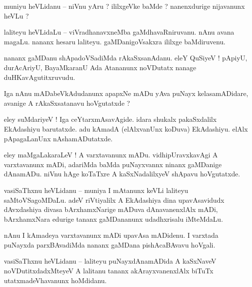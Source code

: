 \documentclass{article}
\begin{document}
\begin{mn}%
muniyu heVLidanu -- niVnu yAru ? ililxgeVke baMde ? nanenxdurige nijavanunx heVLu ?
\end{mn}

\begin{mn}%
laliteyu heVLidaLu -- viVradhanavxneMba gaMdhavaRniruvanu. nAnu avana magaLu. nananx hesaru 
laliteyu. gaMDanigoVsakxra ililxge baMdiruvenu.
\end{mn}

\begin{mn}%
nananx gaMDanu shApadoVSadiMda rAkaSxsanAdanu. eleY QuSiyeV ! pApiyU, durAcAriyU, BayaMkaranU Ada 
Atananunx noVDutatx nanage duHKavAgutitxruvudu.
\end{mn}

\begin{mn}%
Iga nAnu mADabeVkAdudanunx apapxNe mADu yAva puNayx kelasamADidare, avanige A rAkaSxsatanavu 
hoVgutatxde ?
\end{mn}

\begin{mn}%
eley suMdariyeV ! Iga ceYtarxmAsavAgide. idara shukalx pakaSxdalilx EkAdashiyu barutatxde. adu 
kAmadA (elAlxvanUnx koDuva) EkAdashiyu. elAlx pApagaLanUnx nAshamADutatxde.
\end{mn}

\begin{mn}%
eley maMgaLakaraLeV ! A varxtavanunx mADu. vidhipUravxkavAgi A varxtavanunx mADi, adariMda baMda 
puNayxvannx ninanx gaMDanige dAnamADu. niVnu hAge koTaTxre A kaSxNadalilxyeV shApavu hoVgutatxde.
\end{mn}

\begin{mn}%
vasiSaThxnu heVLidanu -- muniya I mAtanunx keVLi laliteyu saMtoVSagoMDaLu. adeV riVtiyalilx A 
EkAdashiya dina upavAsavidudx dAvxdashiya divasa bArxhamxNarige mADuva dAnavanenxlAlx mADi, 
bArxhamxNara edurige tananx gaMDananunx udadhxrisalu iMteMdaLu.
\end{mn}

\begin{mn}%
nAnu I kAmadeya varxtavanunx mADi upavAsa mADidenu. I varxtada puNayxda parxBAvadiMda nananx 
gaMDana pishAcaBAvavu hoVgali.
\end{mn}

\begin{mn}%
vasiSaThxnu heVLidanu -- laliteyu puNayxdAnamADida A kaSxNaveV noVDutitxdadxMteyeV A lalitanu 
tananx akArayxvanenxlAlx biTuTx utatxmadeVhavanunx hoMdidanu.
\end{mn}
\end{document}

